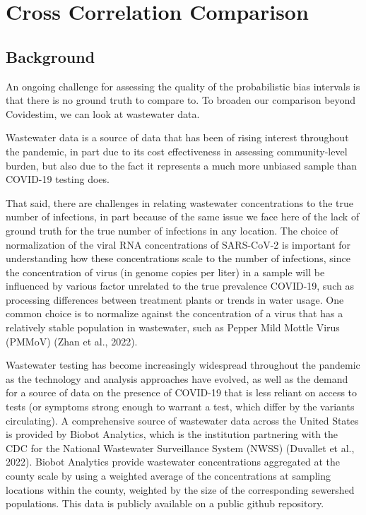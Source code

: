\documentclass[12pt,twoside]{smiththesis}
\begin{document}
\hypertarget{cross-correlation-comparison}{%
\section{Cross Correlation Comparison}\label{cross-correlation-comparison}}

\hypertarget{background-1}{%
\subsection{Background}\label{background-1}}

An ongoing challenge for assessing the quality of the probabilistic bias intervals is that there is no ground truth to compare to. To broaden our comparison beyond Covidestim, we can look at wastewater data.

Wastewater data is a source of data that has been of rising interest throughout the pandemic, in part due to its cost effectiveness in assessing community-level burden, but also due to the fact it represents a much more unbiased sample than COVID-19 testing does.

That said, there are challenges in relating wastewater concentrations to the true number of infections, in part because of the same issue we face here of the lack of ground truth for the true number of infections in any location. The choice of normalization of the viral RNA concentrations of SARS-CoV-2 is important for understanding how these concentrations scale to the number of infections, since the concentration of virus (in genome copies per liter) in a sample will be influenced by various factor unrelated to the true prevalence COVID-19, such as processing differences between treatment plants or trends in water usage. One common choice is to normalize against the concentration of a virus that has a relatively stable population in wastewater, such as Pepper Mild Mottle Virus (PMMoV) (Zhan et al., 2022).

Wastewater testing has become increasingly widespread throughout the pandemic as the technology and analysis approaches have evolved, as well as the demand for a source of data on the presence of COVID-19 that is less reliant on access to tests (or symptoms strong enough to warrant a test, which differ by the variants circulating). A comprehensive source of wastewater data across the United States is provided by Biobot Analytics, which is the institution partnering with the CDC for the National Wastewater Surveillance System (NWSS) (Duvallet et al., 2022). Biobot Analytics provide wastewater concentrations aggregated at the county scale by using a weighted average of the concentrations at sampling locations within the county, weighted by the size of the corresponding sewershed populations. This data is publicly available on a public github repository.
\end{document}
